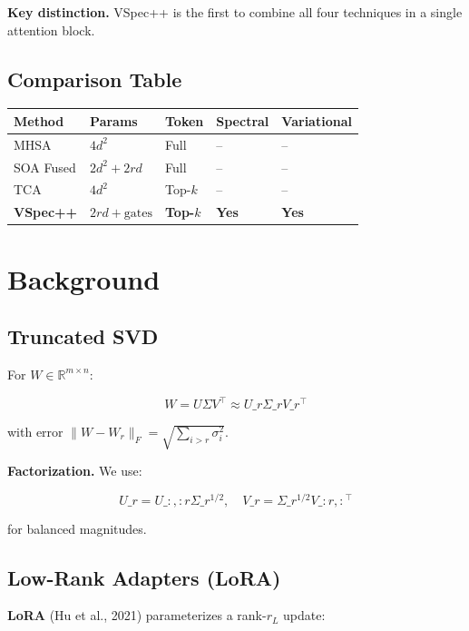 \textbf{Key distinction.} VSpec++ is the first to combine all four techniques 
in a single attention block.



\subsection{Comparison Table}

\begin{table}[H]
\centering
\small
\begin{tabular}{lllll}
\toprule
\textbf{Method} & \textbf{Params} & \textbf{Token} & \textbf{Spectral} & \textbf{Variational} \\
\midrule
MHSA & $4d^2$ & Full & -- & -- \\
SOA Fused & $2d^2 + 2rd$ & Full & -- & -- \\
TCA & $4d^2$ & Top-$k$ & -- & -- \\
\textbf{VSpec++} & $2rd + \text{gates}$ & \textbf{Top-$k$} & \textbf{Yes} & \textbf{Yes} \\
\bottomrule
\end{tabular}
\end{table}



\section{Background}

\subsection{Truncated SVD}

For $W \in \mathbb{R}^{m \times n}$:

\[
W = U \Sigma V^\top \approx U\_r \Sigma\_r V\_r^\top
\tag{3.1}
\]

with error $\|W - W_r\|_F = \sqrt{\sum_{i > r} \sigma_i^2}$.

\textbf{Factorization.} We use:

\[
U\_r = U\_{:, :r} \Sigma\_r^{1/2}, \quad V\_r = \Sigma\_r^{1/2} V\_{:r, :}^\top
\tag{3.2}
\]

for balanced magnitudes.

\subsection{Low-Rank Adapters (LoRA)}

\textbf{LoRA} (Hu et al., 2021) parameterizes a rank-$r_L$ update:

